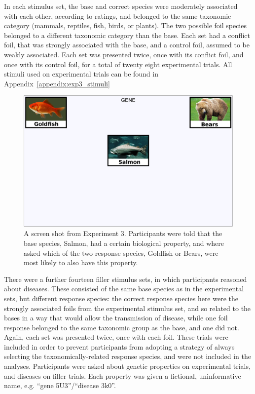 In each stimulus set, the base
and correct species were moderately associated with each other,
according to  ratings,
and belonged to the same taxonomic category
(mammals, reptiles, fish, birds, or plants).
The two possible foil species belonged to
a different taxonomic category than the base.
Each set had a conflict foil,
that was strongly associated with the base,
and a control foil, assumed to be weakly associated.
Each set was presented twice, once with its conflict foil,
and once with its control foil, for a total of twenty eight
experimental trials.
All stimuli used on experimental trials
can be found in Appendix~\ref{appendix:exp3_stimuli}

\begin{figure}[ht]
  \centering
  \includegraphics[width=\figurewidth]{imgs/exp3_screenshot.png}
  \caption[A screen shot from Experiment 3.]{\label{fig:exp3_screenshot}
    A screen shot from Experiment 3.
    Participants were told that the base species, Salmon,
    had a certain biological property,
    and where asked which of the two response species,
    Goldfish or Bears, were most likely to also have this property.
  }
\end{figure}

There were a further fourteen filler stimulus sets,
in which participants reasoned about diseases.
These consisted of the same base species as in the experimental sets,
but different response species:
the correct response species here were
the strongly associated foils from the experimental stimulus set,
and so related to the bases in a way
that would allow the transmission of disease,
while one foil response belonged to the same taxonomic group as the base,
and one did not.
Again, each set was presented twice, once with each foil.
These trials were included in order to prevent participants
from adopting a strategy of always selecting
the taxonomically-related response species,
and were not included in the analyses.
Participants were asked about genetic properties on experimental trials,
and diseases on filler trials.
Each property was given a fictional, uninformative name,
e.g. ``gene 5U3''/``disease 3k0''.






